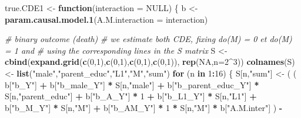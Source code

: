 \documentclass[
]{book}
\newenvironment{Shaded}{\begin{snugshade}}{\end{snugshade}}
\newcommand{\AttributeTok}[1]{\textcolor[rgb]{0.13,0.29,0.53}{#1}}
\newcommand{\CommentTok}[1]{\textcolor[rgb]{0.56,0.35,0.01}{\textit{#1}}}
\newcommand{\ConstantTok}[1]{\textcolor[rgb]{0.56,0.35,0.01}{#1}}
\newcommand{\ControlFlowTok}[1]{\textcolor[rgb]{0.13,0.29,0.53}{\textbf{#1}}}
\newcommand{\DecValTok}[1]{\textcolor[rgb]{0.00,0.00,0.81}{#1}}
\newcommand{\FunctionTok}[1]{\textcolor[rgb]{0.13,0.29,0.53}{\textbf{#1}}}
\newcommand{\NormalTok}[1]{#1}
\newcommand{\OtherTok}[1]{\textcolor[rgb]{0.56,0.35,0.01}{#1}}
\newcommand{\SpecialCharTok}[1]{\textcolor[rgb]{0.81,0.36,0.00}{\textbf{#1}}}
\newcommand{\StringTok}[1]{\textcolor[rgb]{0.31,0.60,0.02}{#1}}
\begin{document}
\begin{Shaded}
\begin{Highlighting}[]
\NormalTok{true.CDE1 }\OtherTok{\textless{}{-}} \ControlFlowTok{function}\NormalTok{(}\AttributeTok{interaction =} \ConstantTok{NULL}\NormalTok{) \{}
\NormalTok{  b }\OtherTok{\textless{}{-}} \FunctionTok{param.causal.model.1}\NormalTok{(}\AttributeTok{A.M.interaction =}\NormalTok{ interaction)}
  
  \CommentTok{\# binary outcome (death)}
  \CommentTok{\# we estimate both CDE, fixing do(M) = 0 et do(M) = 1 and }
  \CommentTok{\# using the corresponding lines in the S matrix}
\NormalTok{  S }\OtherTok{\textless{}{-}} \FunctionTok{cbind}\NormalTok{(}\FunctionTok{expand.grid}\NormalTok{(}\FunctionTok{c}\NormalTok{(}\DecValTok{0}\NormalTok{,}\DecValTok{1}\NormalTok{),}\FunctionTok{c}\NormalTok{(}\DecValTok{0}\NormalTok{,}\DecValTok{1}\NormalTok{),}\FunctionTok{c}\NormalTok{(}\DecValTok{0}\NormalTok{,}\DecValTok{1}\NormalTok{),}\FunctionTok{c}\NormalTok{(}\DecValTok{0}\NormalTok{,}\DecValTok{1}\NormalTok{)), }\FunctionTok{rep}\NormalTok{(}\ConstantTok{NA}\NormalTok{,}\AttributeTok{n=}\DecValTok{2}\SpecialCharTok{\^{}}\DecValTok{3}\NormalTok{))}
  \FunctionTok{colnames}\NormalTok{(S) }\OtherTok{\textless{}{-}} \FunctionTok{list}\NormalTok{(}\StringTok{"male"}\NormalTok{,}\StringTok{"parent\_educ"}\NormalTok{,}\StringTok{"L1"}\NormalTok{,}\StringTok{"M"}\NormalTok{,}\StringTok{"sum"}\NormalTok{)}
  \ControlFlowTok{for}\NormalTok{ (n }\ControlFlowTok{in} \DecValTok{1}\SpecialCharTok{:}\DecValTok{16}\NormalTok{) \{}
\NormalTok{    S[n,}\StringTok{"sum"}\NormalTok{] }\OtherTok{\textless{}{-}}\NormalTok{ ( ( b[}\StringTok{"b\_Y"}\NormalTok{] }\SpecialCharTok{+} 
\NormalTok{                        b[}\StringTok{"b\_male\_Y"}\NormalTok{] }\SpecialCharTok{*}\NormalTok{ S[n,}\StringTok{"male"}\NormalTok{] }\SpecialCharTok{+} 
\NormalTok{                        b[}\StringTok{"b\_parent\_educ\_Y"}\NormalTok{] }\SpecialCharTok{*}\NormalTok{ S[n,}\StringTok{"parent\_educ"}\NormalTok{] }\SpecialCharTok{+} 
\NormalTok{                        b[}\StringTok{"b\_A\_Y"}\NormalTok{] }\SpecialCharTok{*} \DecValTok{1} \SpecialCharTok{+} 
\NormalTok{                        b[}\StringTok{"b\_L1\_Y"}\NormalTok{] }\SpecialCharTok{*}\NormalTok{ S[n,}\StringTok{"L1"}\NormalTok{] }\SpecialCharTok{+}
\NormalTok{                        b[}\StringTok{"b\_M\_Y"}\NormalTok{] }\SpecialCharTok{*}\NormalTok{ S[n,}\StringTok{"M"}\NormalTok{] }\SpecialCharTok{+}
\NormalTok{                        b[}\StringTok{"b\_AM\_Y"}\NormalTok{] }\SpecialCharTok{*} \DecValTok{1} \SpecialCharTok{*}\NormalTok{ S[n,}\StringTok{"M"}\NormalTok{] }\SpecialCharTok{*}\NormalTok{ b[}\StringTok{"A.M.inter"}\NormalTok{] ) }\SpecialCharTok{{-}} 

\end{Highlighting}
\end{Shaded}
\end{document}
